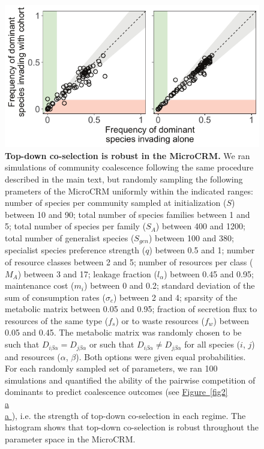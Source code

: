 \documentclass[a4paper,10pt]{article}
\newcommand{\figref}[2][]{%
  \hyperref[{#2}]{%
    Figure~\ref*{#2}%
    \ifx\\#1\\%
    \else
      #1%
    \fi
  }%
}
\begin{document}
\begin{figure}[!h]
\centering
\internallinenumbers
\includegraphics[scale=0.9,keepaspectratio]{figs/figS4.pdf}
\caption{\textbf{Top-down co-selection is robust in the MicroCRM.}
We ran simulations of community coalescence following the same
procedure described in the main text, but randomly sampling the
following prameters of the MicroCRM
uniformly within the indicated ranges:
number of species per community sampled at initialization ($S$) between 10 and 90;
total number of species families between 1 and 5;
total number of species per family ($S_A$) between 400 and 1200;
total number of generalist species ($S_{gen}$) between 100 and 380;
specialist species preference strength ($q$) between 0.5 and 1;
number of resource classes between 2 and 5;
number of resources per class ($M_A$) between 3 and 17;
leakage fraction ($l_{\alpha}$) between 0.45 and 0.95;
maintenance cost ($m_i$) between 0 and 0.2;
standard deviation of the sum of consumption rates ($\sigma_c$) between 2 and 4;
sparsity of the metabolic matrix between 0.05 and 0.95;
fraction of secretion flux to resources of the same type ($f_s$) or to waste resources ($f_w$) between 0.05 and 0.45.
The metabolic matrix was randomly chosen to be such that $D_{i\beta\alpha}=D_{j\beta\alpha}$ or such that
$D_{i\beta\alpha} \neq D_{j\beta\alpha}$ for all species ($i$, $j$) and resources ($\alpha$, $\beta$).
Both options were given equal probabilities.
For each randomly sampled set of parameters, we ran 100 simulations
and quantified the ability of the pairwise competition
of dominants to predict coalescence outcomes (see \figref[a]{fig2}), i.e. the strength of top-down co-selection
in each regime.
The histogram shows that top-down co-selection is robust throughout the parameter space in the MicroCRM.}
\label{figSX}
\end{figure}

\clearpage
\end{document}

